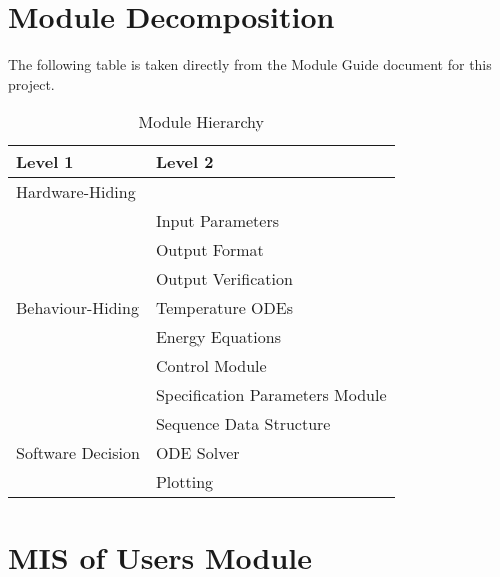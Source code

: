 \documentclass[12pt, titlepage]{article}
\begin{document}
\section{Module Decomposition}

The following table is taken directly from the Module Guide document for this project.

\begin{table}[h!]
	\centering
	\begin{tabular}{p{} p{}}
		\toprule
		\textbf{Level 1}                               & \textbf{Level 2}                \\
		\midrule

		{Hardware-Hiding}                              & ~                               \\
		\midrule

		\multirow{7}{0.3\textwidth}{Behaviour-Hiding}  & Input Parameters                \\
		                                               & Output Format                   \\
		                                               & Output Verification             \\
		                                               & Temperature ODEs                \\
		                                               & Energy Equations                \\
		                                               & Control Module                  \\
		                                               & Specification Parameters Module \\
		\midrule

		\multirow{3}{0.3\textwidth}{Software Decision} & {Sequence Data Structure}       \\
		                                               & ODE Solver                      \\
		                                               & Plotting                        \\
		\bottomrule

	\end{tabular}
	\caption{Module Hierarchy}
	\label{TblMH}
\end{table}

\newpage

\section{MIS of Users Module} \label{mUsers}
\end{document}
